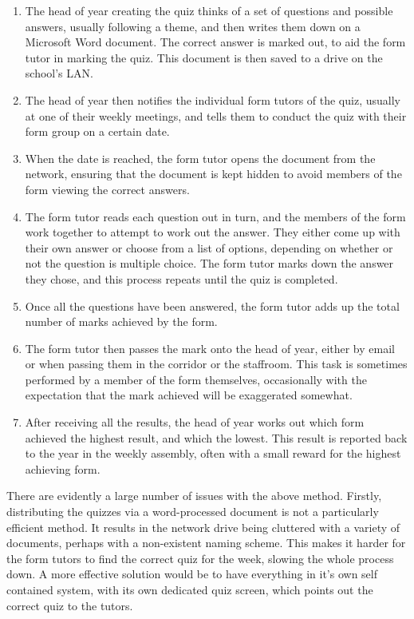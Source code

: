 \begin{enumerate}
\item The head of year creating the quiz thinks of a set of questions and possible answers, usually following a theme, and then writes them down on a Microsoft Word document. The correct answer is marked out, to aid the form tutor in marking the quiz. This document is then saved to a drive on the school's LAN.

\item The head of year then notifies the individual form tutors of the quiz, usually at one of their weekly meetings, and tells them to conduct the quiz with their form group on a certain date.

\item When the date is reached, the form tutor opens the document from the network, ensuring that the document is kept hidden to avoid members of the form viewing the correct answers.

\item The form tutor reads each question out in turn, and the members of the form work together to attempt to work out the answer. They either come up with their own answer or choose from a list of options, depending on whether or not the question is multiple choice. The form tutor marks down the answer they chose, and this process repeats until the quiz is completed.

\item Once all the questions have been answered, the form tutor adds up the total number of marks achieved by the form.

\item The form tutor then passes the mark onto the head of year, either by email or when passing them in the corridor or the staffroom. This task is sometimes performed by a member of the form themselves, occasionally with the expectation that the mark achieved will be exaggerated somewhat.

\item After receiving all the results, the head of year works out which form achieved the highest result, and which the lowest. This result is reported back to the year in the weekly assembly, often with a small reward for the highest achieving form.
\end{enumerate}

There are evidently a large number of issues with the above method. Firstly, distributing the quizzes via a word-processed document is not a particularly efficient method. It results in the network drive being cluttered with a variety of documents, perhaps with a non-existent naming scheme. This makes it harder for the form tutors to find the correct quiz for the week, slowing the whole process down. A more effective solution would be to have everything in it's own self contained system, with its own dedicated quiz screen, which points out the correct quiz to the tutors.

